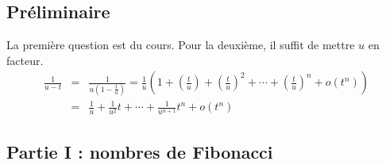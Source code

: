 \subsection*{Pr{\'e}liminaire}

La premi{\`e}re question est du cours. Pour la deuxi{\`e}me, il suffit de
mettre $u$ en facteur.
\begin{eqnarray*}
\frac{1}{u-t} &=&\frac{1}{u(1-\frac{t}{u})}=\frac{1}{u}(1+(\frac{t}{u})+(%
\frac{t}{u})^{2}+\cdots +(\frac{t}{u})^{n}+o(t^{n})) \\
&=&\frac{1}{u}+\frac{1}{u^{2}}t+\cdots +\frac{1}{u^{n+1}}t^{n}+o(t^{n})
\end{eqnarray*}

\subsection*{Partie I : nombres de Fibonacci}

